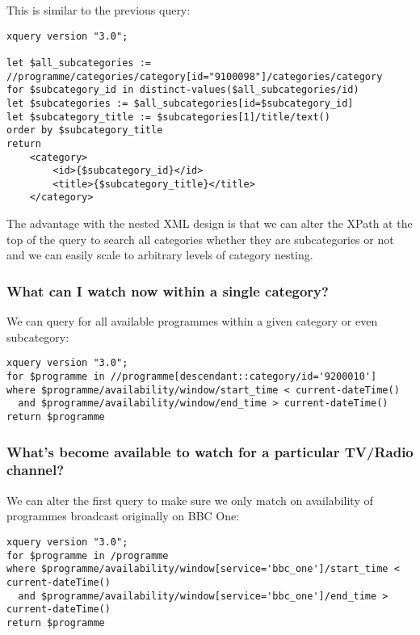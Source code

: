\documentclass[11pt,a4paper]{article}
\begin{document}
This is similar to the previous query:

\begin{lstlisting}
xquery version "3.0";

let $all_subcategories := //programme/categories/category[id="9100098"]/categories/category
for $subcategory_id in distinct-values($all_subcategories/id)
let $subcategories := $all_subcategories[id=$subcategory_id]
let $subcategory_title := $subcategories[1]/title/text()
order by $subcategory_title
return 
    <category>
        <id>{$subcategory_id}</id>
        <title>{$subcategory_title}</title>
    </category>
\end{lstlisting}

The advantage with the nested XML design is that we can alter the XPath at
the top of the query to search all categories whether they are subcategories
or not and we can easily scale to arbitrary levels of category nesting.

\subsubsection{What can I watch now within a single category?}

We can query for all available programmes within a given category or even subcategory:

\begin{lstlisting}
xquery version "3.0";
for $programme in //programme[descendant::category/id='9200010']
where $programme/availability/window/start_time < current-dateTime()
  and $programme/availability/window/end_time > current-dateTime()
return $programme
\end{lstlisting}

\subsubsection{What's become available to watch for a particular TV/Radio channel?}

We can alter the first query to make sure we only match on availability of
programmes broadcast originally on BBC One:

\begin{lstlisting}
xquery version "3.0";
for $programme in /programme
where $programme/availability/window[service='bbc_one']/start_time < current-dateTime()
  and $programme/availability/window[service='bbc_one']/end_time > current-dateTime()
return $programme
\end{lstlisting}
\end{document}
